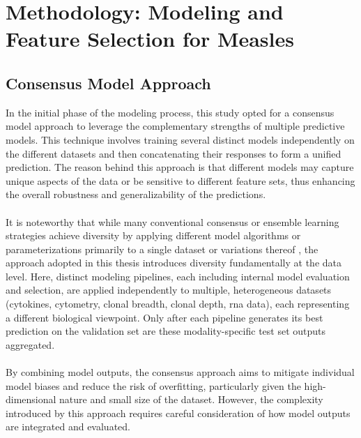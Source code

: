 \documentclass[12pt,a4paper]{report}
\newcommand{\todo}[1]{%
  \par\noindent%
  \begin{tcolorbox}[colback=yellow, colframe=black, boxrule=0.5pt, sharp corners, width=\linewidth, before skip=5pt, after skip=5pt]
    \textbf{TODO:} #1
  \end{tcolorbox}%
  \par
}
\begin{document}
\chapter{Methodology: Modeling and Feature Selection for Measles}
\label{chap:methodology}
\section{Consensus Model Approach}
\label{sec:consensus_model_approach}
\noindent
In the initial phase of the modeling process, this study opted for a consensus model approach to leverage the complementary strengths of multiple predictive models. This technique involves training several distinct models independently on the different datasets and then concatenating their responses to form a unified prediction. The reason behind this approach is that different models may capture unique aspects of the data or be sensitive to different feature sets, thus enhancing the overall robustness and generalizability of the predictions.\\
\\
It is noteworthy that while many conventional consensus or ensemble learning strategies achieve diversity by applying different model algorithms or parameterizations primarily to a single dataset or variations thereof \cite{Rokach2010}, the approach adopted in this thesis introduces diversity fundamentally at the data level. Here, distinct modeling pipelines, each including internal model evaluation and selection, are applied independently to multiple, heterogeneous datasets (cytokines, cytometry, clonal breadth, clonal depth, \acrshort{rna} data), each representing a different biological viewpoint. Only after each pipeline generates its best prediction on the validation set are these modality-specific test set outputs aggregated.\\
\\
By combining model outputs, the consensus approach aims to mitigate individual model biases and reduce the risk of overfitting, particularly given the high-dimensional nature and small size of the dataset. However, the complexity introduced by this approach requires careful consideration of how model outputs are integrated and evaluated. 
\end{document}
